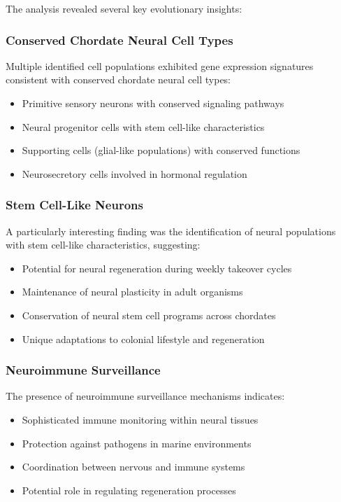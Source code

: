 \documentclass[12pt,a4paper]{article}
\begin{document}
The analysis revealed several key evolutionary insights:

\subsubsection{Conserved Chordate Neural Cell Types}
Multiple identified cell populations exhibited gene expression signatures consistent with conserved chordate neural cell types:

\begin{itemize}
\item Primitive sensory neurons with conserved signaling pathways
\item Neural progenitor cells with stem cell-like characteristics
\item Supporting cells (glial-like populations) with conserved functions
\item Neurosecretory cells involved in hormonal regulation
\end{itemize}

\subsubsection{Stem Cell-Like Neurons}
A particularly interesting finding was the identification of neural populations with stem cell-like characteristics, suggesting:

\begin{itemize}
\item Potential for neural regeneration during weekly takeover cycles
\item Maintenance of neural plasticity in adult organisms
\item Conservation of neural stem cell programs across chordates
\item Unique adaptations to colonial lifestyle and regeneration
\end{itemize}

\subsubsection{Neuroimmune Surveillance}
The presence of neuroimmune surveillance mechanisms indicates:

\begin{itemize}
\item Sophisticated immune monitoring within neural tissues
\item Protection against pathogens in marine environments
\item Coordination between nervous and immune systems
\item Potential role in regulating regeneration processes
\end{itemize}
\end{document}
